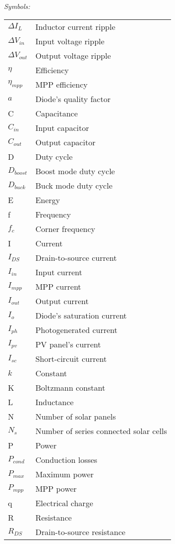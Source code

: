 \noindent\textit{Symbols:}\newline
\begin{tabular}{ll}
$\Delta I_{L}$ & Inductor current ripple\\
$\Delta V_{in}$ & Input voltage ripple\\
$\Delta V_{out}$ & Output voltage ripple\\
$\eta$ & Efficiency\\
$\eta_{mpp}$ & MPP efficiency\\
$a$ & Diode's quality factor \\
C & Capacitance\\
$C_{in}$ & Input capacitor\\
$C_{out}$ & Output capacitor\\
D & Duty cycle\\
$D_{boost}$ & Boost mode duty cycle\\
$D_{buck}$ & Buck mode duty cycle\\
E & Energy\\
f & Frequency\\
$f_{c}$ & Corner frequency \\
I & Current\\
$I_{DS}$ & Drain-to-source current \\
$I_{in}$ & Input current \\
$I_{mpp}$ & MPP current\\
$I_{out}$ & Output current \\
$I_{o}$ & Diode's saturation current \\
$I_{ph}$ & Photogenerated current \\
$I_{pv}$ & PV panel's current \\
$I_{sc}$ & Short-circuit current\\
$k$ & Constant \\
K & Boltzmann constant \\
L & Inductance\\
N & Number of solar panels \\
$N_{s}$ & Number of series connected solar cells \\
P & Power\\
$P_{cond}$ & Conduction losses \\
$P_{max}$ & Maximum power \\
$P_{mpp}$ & MPP power \\
q & Electrical charge \\
R & Resistance\\
$R_{DS}$ & Drain-to-source resistance\\

\end{tabular}
